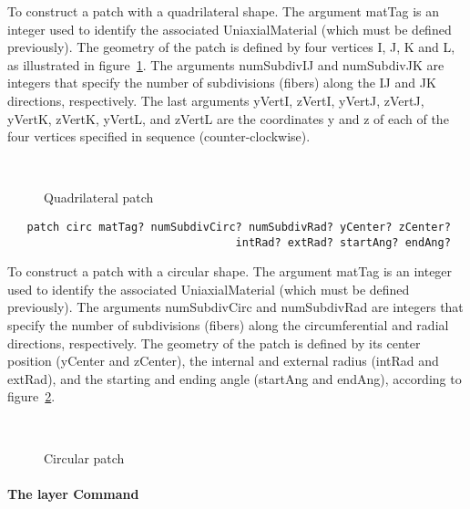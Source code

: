 \documentclass[12pt]{article}
\begin{document}
\noindent To construct a patch with a quadrilateral shape. The
argument matTag is an integer used to identify the associated
UniaxialMaterial (which must be defined previously). The geometry of 
the patch is defined by four vertices I, J, K and L, as illustrated
in figure~\ref{quadPatch}. The arguments numSubdivIJ and numSubdivJK are integers
that specify the number of subdivisions (fibers) along the IJ and JK 
directions, respectively. The last arguments yVertI, zVertI, yVertJ,
zVertJ, yVertK, zVertK, yVertL, and zVertL
are the coordinates y and z of each of the four vertices specified in sequence
(counter-clockwise).
 


\begin{figure}[htpb]
\begin{center}
\leavevmode
\hbox{%
}
\end{center}
\caption{Quadrilateral patch}
\label{quadPatch}
\end{figure}


{\sf\small
\begin{verbatim}
   patch circ matTag? numSubdivCirc? numSubdivRad? yCenter? zCenter? 
                                   intRad? extRad? startAng? endAng?
\end{verbatim}
}

\noindent To construct a patch with a circular shape. The
argument matTag is an integer used to identify the associated
UniaxialMaterial (which must be defined previously). 
The arguments numSubdivCirc and numSubdivRad are integers
that specify the number of subdivisions (fibers) along the
circumferential and radial directions, respectively. 
The geometry of the patch is defined by its center position
(yCenter and zCenter), the internal and external radius 
(intRad and extRad), and the starting and ending angle (startAng 
and endAng), according to figure~\ref{circPatch}. 



\begin{figure}[htpb]
\begin{center}
\leavevmode
\hbox{%
}
\end{center}
\caption{Circular patch}
\label{circPatch}
\end{figure}

\paragraph{The layer Command}
\end{document}
